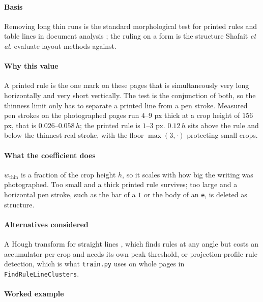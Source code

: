 \paragraph{Basis}

Removing long thin runs is the standard morphological test for printed rules and table lines in document analysis \cite{haralick1987}; the ruling on a form is the structure Shafait \textit{et al.} \cite{shafait2008} evaluate layout methods against.

\paragraph{Why this value}

A printed rule is the one mark on these pages that is simultaneously very long horizontally and very short vertically. The test is the conjunction of both, so the thinness limit only has to separate a printed line from a pen stroke. Measured pen strokes on the photographed pages run $4$--$9$ px thick at a crop height of $156$ px, that is $0.026$--$0.058\,h$; the printed rule is $1$--$3$ px. $0.12\,h$ sits above the rule and below the thinnest real stroke, with the floor $\max(3,\cdot)$ protecting small crops.

\paragraph{What the coefficient does}

$w_{\text{thin}}$ is a fraction of the crop height $h$, so it scales with how big the writing was photographed. Too small and a thick printed rule survives; too large and a horizontal pen stroke, such as the bar of a \texttt{t} or the body of an \texttt{e}, is deleted as structure.

\paragraph{Alternatives considered}

A Hough transform for straight lines \cite{duda1972}, which finds rules at any angle but costs an accumulator per crop and needs its own peak threshold, or projection-profile rule detection, which is what \texttt{train.py} uses on whole pages in \texttt{FindRuleLineClusters}.

\paragraph{Worked example}

